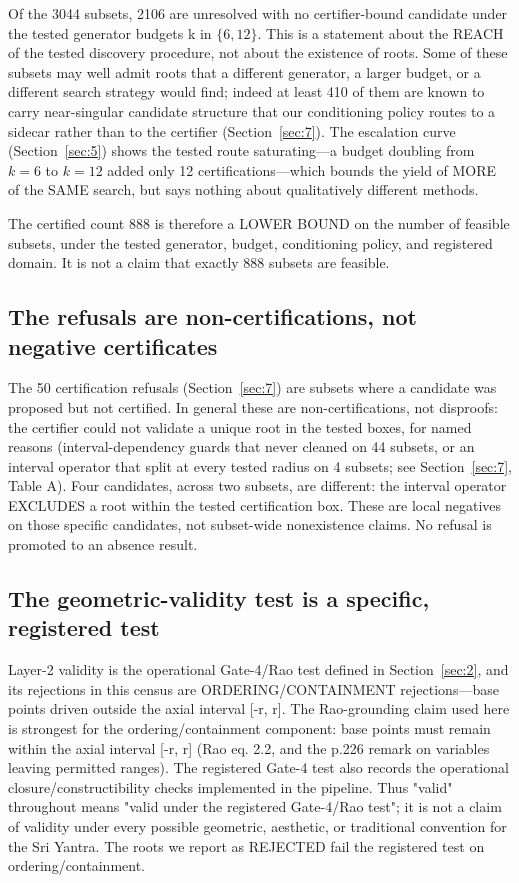 \documentclass[pdflatex,sn-mathphys-num]{sn-jnl}
\begin{document}
Of the 3044 subsets, 2106 are unresolved with no certifier-bound candidate under the tested generator budgets k in $\{6,12\}$. This is a statement about the REACH of the tested discovery procedure, not about the existence of roots. Some of these subsets may well admit roots that a different generator, a larger budget, or a different search strategy would find; indeed at least 410 of them are known to carry near-singular candidate structure that our conditioning policy routes to a sidecar rather than to the certifier (Section~\ref{sec:7}). The escalation curve (Section~\ref{sec:5}) shows the tested route saturating---a
budget doubling from $k{=}6$ to $k{=}12$ added only 12 certifications---which bounds the yield of MORE of the SAME search, but says nothing about qualitatively different methods.

The certified count 888 is therefore a LOWER BOUND on the number of feasible subsets, under the tested generator, budget, conditioning policy, and registered domain. It is not a claim that exactly 888 subsets are feasible.

\subsection{The refusals are non-certifications, not negative certificates}\label{sec:8.3}

The 50 certification refusals (Section~\ref{sec:7}) are subsets where a candidate was proposed but not certified. In general these are non-certifications, not disproofs: the certifier could not validate a unique root in the tested boxes, for named reasons (interval-dependency guards that never cleaned on 44 subsets, or an interval operator that split at every tested radius on 4 subsets; see Section~\ref{sec:7}, Table A). Four candidates, across two subsets, are different: the interval operator EXCLUDES a root within the tested certification box. These are local negatives on those specific candidates, not subset-wide nonexistence claims. No refusal is promoted to an absence result.

\subsection{The geometric-validity test is a specific, registered test}\label{sec:8.4}

Layer-2 validity is the operational Gate-4/Rao test defined in Section~\ref{sec:2}, and its rejections in this census are ORDERING/CONTAINMENT rejections---base points driven outside the axial interval [-r, r].
The Rao-grounding claim used here is strongest for the ordering/containment component: base points must remain within the axial interval [-r, r] (Rao eq. 2.2, and the p.226 remark on variables leaving permitted ranges). The registered Gate-4 test also records the operational closure/constructibility checks implemented in the pipeline. Thus "valid" throughout means "valid under the registered Gate-4/Rao test"; it is not a claim of validity under every possible geometric, aesthetic, or traditional convention for the Sri Yantra. The roots we report as REJECTED fail the registered test on ordering/containment.
\end{document}
